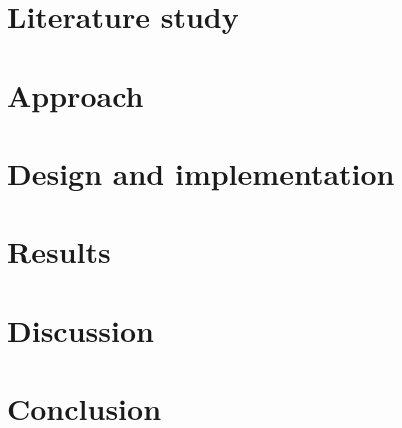 \documentclass{epr400}
\begin{document}
\maketitlepage
\pagestyle{plain}
\vspace*{0.5cm}

\newpage
\tableofcontents
\newpage

\newpage

\newpage
{}
\setcounter{page}{1}

\renewcommand{\eprthepartname}{Design and implementation}
\section{Literature study}
\renewcommand{\eprthepartname}{Literature study}

\clearpage
\section{Approach}
\renewcommand{\eprthepartname}{Approach}

\clearpage
\renewcommand{\eprthepartname}{Design and implementation}
\section{Design and implementation}

\clearpage
\renewcommand{\eprthepartname}{Results}
\section{Results}

\clearpage
\renewcommand{\eprthepartname}{Discussion}
\section{Discussion}

\clearpage
\renewcommand{\eprthepartname}{Conclusion}
\section{Conclusion}

\clearpage
\renewcommand{\eprthepartname}{References}


\clearpage\appendix
\renewcommand{\eprthepartname}{Supporting evidence}

\clearpage

\clearpage

\end{document}
